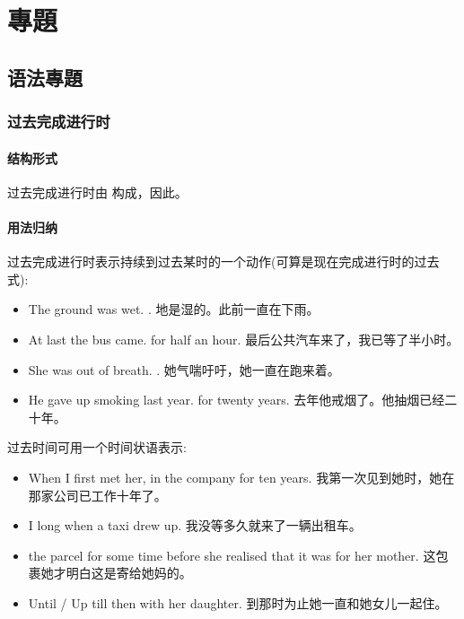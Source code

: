 \chapter{專題}

\section{语法專題}
\subsection{过去完成进行时}
\subsubsection{结构形式}
过去完成进行时由	构成，因此。

\subsubsection{用法归纳}
过去完成进行时表示持续到过去某时的一个动作(可算是现在完成进行时的过去式):
\begin{itemize}
  \itemsep0em
  \item The ground was wet. . 地是湿的。此前一直在下雨。
  \item At last the bus came.  for half an hour. 最后公共汽车来了，我已等了半小时。
  \item She was out of breath. . 她气喘吁吁，她一直在跑来着。
  \item He gave up smoking last year.  for twenty years. 去年他戒烟了。他抽烟已经二十年。
\end{itemize}

过去时间可用一个时间状语表示:
\begin{itemize}
  \itemsep0em
  \item When I first met her,  in the company for ten years. 我第一次见到她时，她在那家公司已工作十年了。
  \item I  long when a taxi drew up. 我没等多久就来了一辆出租车。
  \item {} the parcel for some time before she realised that it was for her mother. 这包裹她才明白这是寄给她妈的。
  \item Until / Up till then  with her daughter. 到那时为止她一直和她女儿一起住。
\end{itemize}

